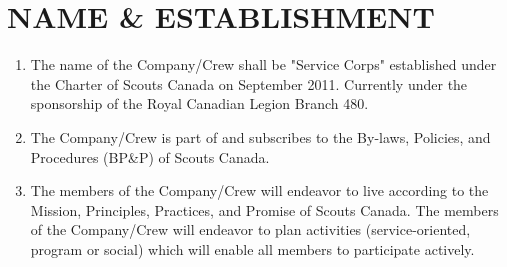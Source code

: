 \documentclass{Service_Corps_Document}
\begin{document}
\def \Title {Constitution}
\def \Company {Service Corps}
\def \versionNumber {4.0}
\stdFooter
\begin{titlepage}
	\stdTitlePage
\end{titlepage}

\tableofcontents	
		
\newpage
\section{NAME \& ESTABLISHMENT}
\begin{enumerate}
	\item The name of the Company/Crew shall be "Service Corps" established under the Charter of Scouts Canada on September 2011. Currently under the sponsorship of the Royal Canadian Legion Branch 480.
	\item The Company/Crew is part of and subscribes to the By-laws, Policies, and Procedures (BP\&P) of Scouts Canada.
	\item The members of the Company/Crew will endeavor to live according to the Mission, Principles, Practices, and Promise of Scouts Canada. The members of the Company/Crew will endeavor to plan activities (service-oriented, program or social) which will enable all members to participate actively.
\end{enumerate}	
\end{document}
